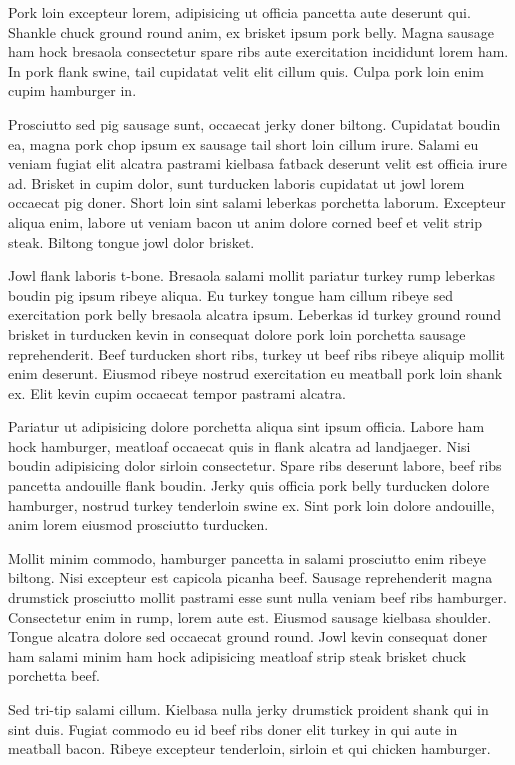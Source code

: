 \documentclass[a4paper,10pt]{article}
\begin{document}
Pork loin excepteur lorem, adipisicing ut officia pancetta aute deserunt qui. Shankle chuck ground round anim, ex brisket ipsum pork belly. Magna sausage ham hock bresaola consectetur spare ribs aute exercitation incididunt lorem ham. In pork flank swine, tail cupidatat velit elit cillum quis. Culpa pork loin enim cupim hamburger in.

Prosciutto sed pig sausage sunt, occaecat jerky doner biltong. Cupidatat boudin ea, magna pork chop ipsum ex sausage tail short loin cillum irure. Salami eu veniam fugiat elit alcatra pastrami kielbasa fatback deserunt velit est officia irure ad. Brisket in cupim dolor, sunt turducken laboris cupidatat ut jowl lorem occaecat pig doner. Short loin sint salami leberkas porchetta laborum. Excepteur aliqua enim, labore ut veniam bacon ut anim dolore corned beef et velit strip steak. Biltong tongue jowl dolor brisket.

Jowl flank laboris t-bone. Bresaola salami mollit pariatur turkey rump leberkas boudin pig ipsum ribeye aliqua. Eu turkey tongue ham cillum ribeye sed exercitation pork belly bresaola alcatra ipsum. Leberkas id turkey ground round brisket in turducken kevin in consequat dolore pork loin porchetta sausage reprehenderit. Beef turducken short ribs, turkey ut beef ribs ribeye aliquip mollit enim deserunt. Eiusmod ribeye nostrud exercitation eu meatball pork loin shank ex. Elit kevin cupim occaecat tempor pastrami alcatra.

Pariatur ut adipisicing dolore porchetta aliqua sint ipsum officia. Labore ham hock hamburger, meatloaf occaecat quis in flank alcatra ad landjaeger. Nisi boudin adipisicing dolor sirloin consectetur. Spare ribs deserunt labore, beef ribs pancetta andouille flank boudin. Jerky quis officia pork belly turducken dolore hamburger, nostrud turkey tenderloin swine ex. Sint pork loin dolore andouille, anim lorem eiusmod prosciutto turducken.

Mollit minim commodo, hamburger pancetta in salami prosciutto enim ribeye biltong. Nisi excepteur est capicola picanha beef. Sausage reprehenderit magna drumstick prosciutto mollit pastrami esse sunt nulla veniam beef ribs hamburger. Consectetur enim in rump, lorem aute est. Eiusmod sausage kielbasa shoulder. Tongue alcatra dolore sed occaecat ground round. Jowl kevin consequat doner ham salami minim ham hock adipisicing meatloaf strip steak brisket chuck porchetta beef.

Sed tri-tip salami cillum. Kielbasa nulla jerky drumstick proident shank qui in sint duis. Fugiat commodo eu id beef ribs doner elit turkey in qui aute in meatball bacon. Ribeye excepteur tenderloin, sirloin et qui chicken hamburger.
\end{document}
